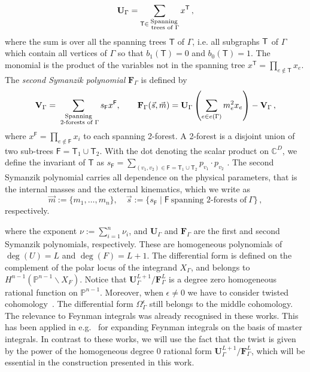 \documentclass[a4paper,12pt]{article}
\numberwithin{equation}{section}
\numberwithin{figure}{section}
\begin{document}
\begin{equation}\label{e:Udef}
{\bf U}_\Gamma = \sum_{\mathsf{T} \in \substack{ \text{Spanning} \\ \text{ trees of } \Gamma}} x^{\mathsf{T}}\,, 
\end{equation}
where the sum is over all the spanning trees $\mathsf{T}$ of $\Gamma$,  i.e.  all subgraphs ${\sf T}$ of $\Gamma$ which contain all
vertices of $\Gamma$ so that $b_1(\mathsf{T}) =0$ and
$b_0(\mathsf{T})=1$. The
monomial is the product of the variables not in the spanning tree
$x^{\mathsf{T}} = \prod_{e\notin {\mathsf{T}}} x_e$. 
The {\em second 
Symanzik polynomial}  $\textbf{F}_\Gamma$ is defined by
\begin{equation}\label{e:VFdef}
{\bf V}_{\Gamma} = \sum_{\substack{ \text{Spanning} \\ \text{ 2-forests
			of } \Gamma}}s_{\mathsf{F}} x^{\mathsf{F}}  ,\qquad {\bf F}_{\Gamma}(\vec{s}, \vec{m}) = {\bf U}_\Gamma\left( \sum_{e \in e(\Gamma)} m_e^2 x_e\right) - {\bf V}_{\Gamma}\,,
\end{equation}
where $x^{\mathsf{F}} =
\prod_{e \notin \mathsf{F}} x_i$ to each spanning 2-forest. A 2-forest
is a disjoint union of two sub-trees $\mathsf{F}=\mathsf{T}_1\cup \mathsf{T}_2$. With the dot denoting the scalar product on $\mathbb C^D$,  we define the invariant of $\mathsf T$ as $s_\mathsf{F} = \sum_{(v_1,v_2) \in \mathsf{F}=\mathsf{T}_1\cup \mathsf{T}_2} p_{v_1}\cdot p_{v_2}$ .
The second Symanzik polynomial carries all dependence on the physical parameters, that is 
the
internal masses and the external kinematics, which we  write as 
\begin{equation}
\vec m:=\{m_1,\dots,m_n\}, \quad  \vec s:=\{s_\textsf{F} \mid \textsf{F} ~ \textrm{spanning
	2-forests of}~\Gamma\}\, ,	
\end{equation}
respectively.


%
where the exponent $\nu:=\sum_{i=1}^n \nu_i$, and $\textbf{U}_\Gamma$ and $\textbf{F}_\Gamma$ are the first and second Symanzik
polynomials, 
%
respectively. These are homogeneous  polynomials of
$\deg(U)=L$ and $\deg(F)=L+1$. 
%
%
The differential form is defined on the complement of the polar locus
of the integrand $X_\Gamma$, and belongs to $H^{n-1}( \mathbb
P^{n-1}\backslash X_F)$. Notice that   $\textbf{U}_\Gamma^{L+1}/\textbf{F}_\Gamma^L$ is a degree
zero homogeneous rational function on $\mathbb
P^{n-1}$. Moreover,  when $\epsilon\neq0$ we have to consider twisted
cohomology~\cite{Aomoto1,Aomoto,Aomoto_1982,AomotoBook}. The differential form
$\Omega_\Gamma^\epsilon$ still belongs to the middle cohomology. The
relevance to Feynman integrals was already recognised in these works. 
This has been applied in
e.g.~\cite{Mizera:2017rqa,Frellesvig:2019uqt,Cacciatori:2021nli}  for
expanding Feynman integrals on the basis of master integrals. In contrast to these works, 
%
we will use
the fact that the twist is given by
the power of the homogeneous degree 0 rational form
$\textbf{U}_\Gamma^{L+1}/\textbf{F}_\Gamma^L$, which will be essential
in the construction presented in this work.
\end{document}
